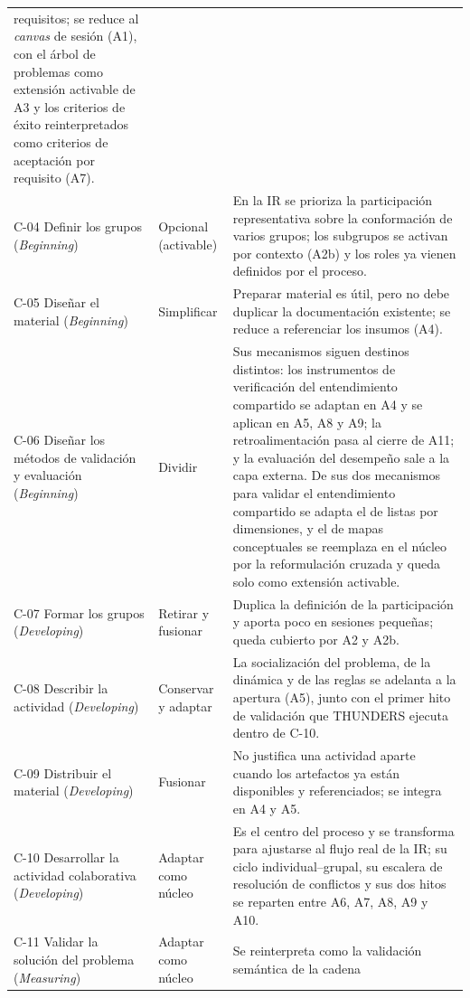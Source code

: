 \documentclass[12pt,letterpaper,oneside]{report}
\begin{document}
{\begin{xltabular}{\textwidth}{@{}>{\raggedright\arraybackslash}p{0.25\textwidth}
                                >{\raggedright\arraybackslash}p{0.14\textwidth}
                                >{\raggedright\arraybackslash}X@{}}
  requisitos; se reduce al \textit{canvas} de sesión (A1), con el árbol de
  problemas como extensión activable de A3 y los criterios de éxito
  reinterpretados como criterios de aceptación por requisito (A7). \\
C-04 Definir los grupos (\textit{Beginning}) & Opcional (activable)
& En la IR se prioriza la participación representativa sobre la conformación
  de varios grupos; los subgrupos se activan por contexto (A2b) y los roles ya
  vienen definidos por el proceso. \\
C-05 Diseñar el material (\textit{Beginning}) & Simplificar
& Preparar material es útil, pero no debe duplicar la documentación existente;
  se reduce a referenciar los insumos (A4). \\
C-06 Diseñar los métodos de validación y evaluación (\textit{Beginning}) & Dividir
& Sus mecanismos siguen destinos distintos: los instrumentos de verificación del
  entendimiento compartido se adaptan en A4 y se aplican en A5, A8 y A9; la
  retroalimentación pasa al cierre de A11; y la evaluación del desempeño sale a
  la capa externa. De sus dos mecanismos para validar el entendimiento compartido se adapta
  el de listas por dimensiones, y el de mapas conceptuales se reemplaza en el
  núcleo por la reformulación cruzada y queda solo como extensión activable. \\
C-07 Formar los grupos (\textit{Developing}) & Retirar y fusionar
& Duplica la definición de la participación y aporta poco en sesiones pequeñas;
  queda cubierto por A2 y A2b. \\
C-08 Describir la actividad (\textit{Developing}) & Conservar y adaptar
& La socialización del problema, de la dinámica y de las reglas se adelanta a
  la apertura (A5), junto con el primer hito de validación que THUNDERS ejecuta
  dentro de C-10. \\
C-09 Distribuir el material (\textit{Developing}) & Fusionar
& No justifica una actividad aparte cuando los artefactos ya están disponibles y
  referenciados; se integra en A4 y A5. \\
C-10 Desarrollar la actividad colaborativa (\textit{Developing}) & Adaptar como núcleo
& Es el centro del proceso y se transforma para ajustarse al flujo real de la
  IR; su ciclo individual--grupal, su escalera de resolución de conflictos y sus dos hitos se
  reparten entre A6, A7, A8, A9 y A10. \\
C-11 Validar la solución del problema (\textit{Measuring}) & Adaptar como núcleo
& Se reinterpreta como la validación semántica de la cadena

\end{xltabular}}
\end{document}
